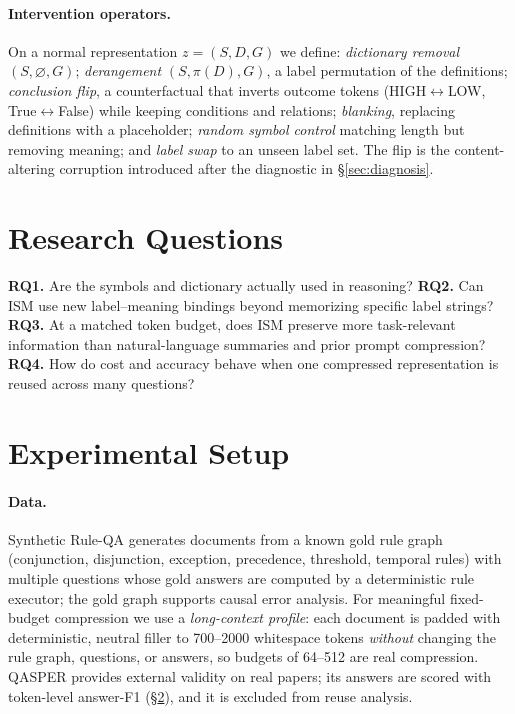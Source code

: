 \documentclass{article}
\begin{document}
\paragraph{Intervention operators.}
On a normal representation $z=(S,D,G)$ we define: \emph{dictionary removal}
$(S,\varnothing,G)$; \emph{derangement} $(S,\pi(D),G)$, a label permutation of the
definitions; \emph{conclusion flip}, a counterfactual that inverts outcome tokens
(HIGH$\leftrightarrow$LOW, True$\leftrightarrow$False) while keeping conditions and
relations; \emph{blanking}, replacing definitions with a placeholder; \emph{random
symbol control} matching length but removing meaning; and \emph{label swap} to an
unseen label set. The flip is the content-altering corruption introduced after the
diagnostic in \S\ref{sec:diagnosis}.

\section{Research Questions}
\textbf{RQ1.} Are the symbols and dictionary actually used in reasoning?
\textbf{RQ2.} Can ISM use new label--meaning bindings beyond memorizing specific
label strings? \textbf{RQ3.} At a matched token budget, does ISM preserve more
task-relevant information than natural-language summaries and prior prompt
compression? \textbf{RQ4.} How do cost and accuracy behave when one compressed
representation is reused across many questions?

\section{Experimental Setup}
\label{sec:setup}
\paragraph{Data.}
Synthetic Rule-QA generates documents from a known gold rule graph (conjunction,
disjunction, exception, precedence, threshold, temporal rules) with multiple
questions whose gold answers are computed by a deterministic rule executor; the
gold graph supports causal error analysis. For meaningful fixed-budget
compression we use a \emph{long-context profile}: each document is padded with
deterministic, neutral filler to 700--2000 whitespace tokens \emph{without}
changing the rule graph, questions, or answers, so budgets of 64--512 are real
compression. QASPER provides external validity on real papers; its answers are
scored with token-level answer-F1 (\S\ref{sec:setup}), and it is excluded from
reuse analysis.
\end{document}
